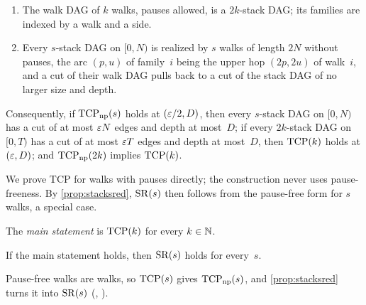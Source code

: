 \begin{proposition}\label{prop:stacksred}
\begin{enumerate}[label=(\alph*)]
\item The walk DAG of $k$ walks, pauses allowed, is a $2k$-stack DAG; its families are indexed by a walk and a side.
\item Every $s$-stack DAG on $[0,N)$ is realized by $s$ walks of length $2N$ without pauses, the arc $(p,u)$ of family~$i$
being the upper hop $(2p,2u)$ of walk~$i$, and a cut of their walk DAG pulls back to a cut of the stack DAG of no larger
size and depth.
\end{enumerate}
Consequently, if $\mathrm{TCP}_{\mathrm{np}}(s)$ holds at $(\varepsilon/2,D)$, then every $s$-stack DAG on $[0,N)$ has a cut of at most
$\varepsilon N$ edges and depth at most~$D$; if every $2k$-stack DAG on $[0,T)$ has a cut of at most $\varepsilon T$ edges and depth at
most~$D$, then $\mathrm{TCP}(k)$ holds at $(\varepsilon,D)$; and $\mathrm{TCP}_{\mathrm{np}}(2k)$ implies $\mathrm{TCP}(k)$.
\end{proposition}

We prove TCP for walks with pauses directly; the construction never uses pause-freeness. By \cref{prop:stacksred}, $\mathrm{SR}(s)$
then follows from the pause-free form for $s$ walks, a special case.

\begin{definition}\label{def:main}
The \emph{main statement} is $\mathrm{TCP}(k)$ for every $k\in\mathbb{N}$.
\end{definition}

\begin{corollary}\label{cor:main}
If the main statement holds, then $\mathrm{SR}(s)$ holds for every~$s$.
\end{corollary}

\begin{outline}
Pause-free walks are walks, so $\mathrm{TCP}(s)$ gives $\mathrm{TCP}_{\mathrm{np}}(s)$, and \cref{prop:stacksred} turns it into $\mathrm{SR}(s)$
(, ).
\end{outline}

